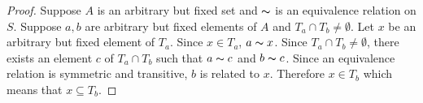 \documentclass{article}
\begin{document}
\begin{flushleft}
\begin{flushleft}
			\begin{proof}
				Suppose $A$ is an arbitrary but fixed set and $\thicksim$ is an equivalence relation on $S$. Suppose $a, b$ are arbitrary but fixed elements of $A$ and $T_a \cap T_b \neq \emptyset$. Let $x$ be an arbitrary but fixed element of $T_a$. Since $x \in T_a$, $a \thicksim x$. Since $T_a \cap T_b \neq \emptyset$, there exists an element $c$ of $T_a \cap T_b$ such that $a \thicksim c$ and $b \thicksim c$. Since an equivalence relation is symmetric and transitive, $b$ is related to $x$. Therefore $x \in T_b$ which means that $x \subseteq T_b$.
			\end{proof}
		\end{flushleft}
		
	\end{flushleft}
\end{document}
